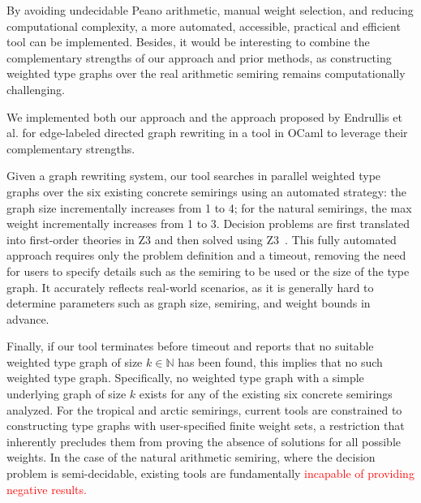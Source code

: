 By avoiding undecidable Peano arithmetic, manual weight selection, and reducing computational complexity, a more automated, accessible, practical and efficient tool can be implemented. Besides, it would be interesting to
combine the complementary strengths of our approach and prior methods, as constructing weighted type graphs over the real arithmetic semiring remains computationally challenging.

We implemented both our approach and the approach proposed by Endrullis et al. \cite{endrullis2024generalized} for edge-labeled directed graph rewriting in a tool in OCaml to leverage their complementary strengths.

Given a graph rewriting system, our tool searches in parallel weighted type graphs over the six existing concrete semirings using an automated strategy: the graph size incrementally increases from 1 to 4; for the natural semirings, the max weight incrementally increases from 1 to 3. Decision problems are first translated into first-order theories in Z3 and then solved using Z3~\cite{de2008z3}.
This fully automated approach requires only the problem definition and a timeout, removing the need for users to specify details such as the semiring to be used or the size of the type graph. 
It accurately reflects real-world scenarios, as it is generally hard to determine parameters such as graph size, semiring, and weight bounds in advance.

Finally, if our tool terminates before timeout and reports that no suitable weighted type graph of size \( k \in \mathbb{N} \) has been found, this implies that no such weighted type graph. Specifically, no weighted type graph with a simple underlying graph of size \( k \) exists for any of the existing six concrete semirings analyzed. 
For the tropical and arctic semirings, current tools are constrained to constructing type graphs with user-specified finite weight sets, a restriction that inherently precludes them from proving the absence of solutions for all possible weights. In the case of the natural arithmetic semiring, where the decision problem is semi-decidable, existing tools are fundamentally \textcolor{red}{incapable of providing negative results.}